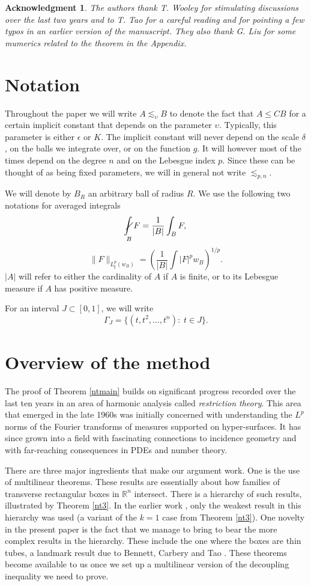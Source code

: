 \documentclass[amssymb,amsfonts,12pt]{amsart}
\newtheorem*{ack*}{Acknowledgment}
\def\R{{\mathbb R}}
\begin{document}
\begin{ack*}
The authors thank T. Wooley for stimulating discussions over the last two years and to T. Tao for a careful reading and for pointing a few typos in an earlier version of the manuscript. They also thank  G. Liu for some mumerics related to the theorem in the Appendix.
\end{ack*}
\bigskip

\section{Notation}
\bigskip


Throughout the paper we will write $A\lesssim_{\upsilon}B$ to denote the fact that $A\le CB$ for a certain implicit constant that depends on the parameter $\upsilon$. Typically, this parameter is either $\epsilon$ or $K$. The implicit constant will never depend on the scale $\delta$, on the balls we integrate over, or on the function $g$. It will however most of the times depend on the degree $n$ and on the Lebesgue index $p$. Since these can  be thought of as being fixed parameters, we will in general not write $\lesssim_{p,n}$.

We will denote by $B_R$ an arbitrary ball of radius $R$. We use the following two notations for averaged integrals
$$\nint_B F=\frac1{|B|}\int_BF,$$
$$\|F\|_{L^p_\sharp(w_B)}=(\frac1{|B|}\int|F|^pw_B)^{1/p}.$$
$|A|$ will refer to either the cardinality of $A$ if $A$ is finite, or to its Lebesgue measure if $A$ has positive measure.

For an interval $J\subset [0,1]$, we will write
$$\Gamma_J=\{(t,t^2,\ldots,t^n):\;t\in J\}.$$

\bigskip

\section{Overview of the method}


The proof of Theorem \ref{ntmain} builds on  significant progress recorded over the last ten years in an area of harmonic analysis called {\em restriction theory}. This area that emerged in the late 1960s was initially concerned with understanding the  $L^p$ norms of the Fourier transforms of measures supported on hyper-surfaces. It has since grown into a field with fascinating connections to incidence geometry and with far-reaching consequences in PDEs and number theory.
\bigskip

There are three major ingredients that make our argument work. One is the use of multilinear theorems. These results are essentially about how families of transverse rectangular boxes in $\R^n$ intersect. There is a hierarchy of such results, illustrated by Theorem \ref{nt3}. In the earlier work \cite{BD4}, only the weakest result in this hierarchy was used (a variant of the $k=1$ case from Theorem \ref{nt3}). One novelty in the present paper is the fact that we manage to bring to bear the more complex results in the hierarchy. These  include the one where the boxes are thin tubes, a landmark result due  to Bennett, Carbery and Tao \cite{BCT}. These theorems become available to us once we set up a multilinear version of the decoupling inequality we need to prove.
\bigskip
\end{document}
